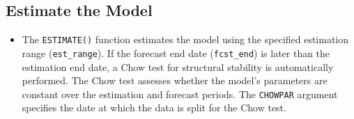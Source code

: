 \documentclass[
  letterpaper,
  DIV=11,
  numbers=noendperiod]{scrreport}
\providecommand{\tightlist}{%
  \setlength{\itemsep}{0pt}\setlength{\parskip}{0pt}}\usepackage{longtable,booktabs,array}
\begin{document}
\subsection{Estimate the Model}\label{estimate-the-model}

\begin{itemize}
\tightlist
\item
  The \texttt{ESTIMATE()} function estimates the model using the
  specified estimation range (\texttt{est\_range}). If the forecast end
  date (\texttt{fcst\_end}) is later than the estimation end date, a
  Chow test for structural stability is automatically performed. The
  Chow test assesses whether the model's parameters are constant over
  the estimation and forecast periods. The \texttt{CHOWPAR} argument
  specifies the date at which the data is split for the Chow test.
\end{itemize}
\end{document}
